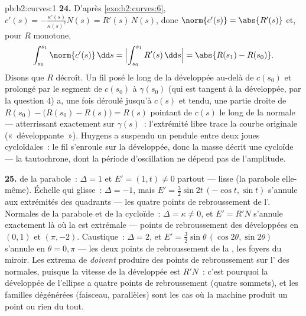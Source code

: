 \begin{solution}{pb:b2:curves:1}
\textbf{24.} D'après \cref{exo:b2:curves:6}, $c'(s) =
-\frac{\kappa'(s)}{\kappa(s)^2}N(s) = R'(s)\,N(s)$, donc
$\norm{c'(s)} = \abs{R'(s)}$ et, pour $R$ monotone,
\[
\int_{s_0}^{s_1}\norm{c'(s)}\,\dd s =
\Bigl|\int_{s_0}^{s_1}R'(s)\,\dd s\Bigr| = \abs{R(s_1) -
R(s_0)} .
\]
Disons que $R$ décroît. Un fil posé le long de la développée
au-delà de $c(s_0)$ et prolongé par le segment de $c(s_0)$ à
$\gamma(s_0)$ (qui est tangent à la développée, par la question 4)
a, une fois déroulé jusqu'à $c(s)$ et tendu, une partie droite de
 $R(s_0) - \bigl(R(s_0) - R(s)\bigr) = R(s)$
pointant de $c(s)$ le long de la normale --- atterrissant
exactement sur $\gamma(s)$~: l'extrémité libre trace la courbe
originale («~développante~»). Huygens a suspendu un pendule entre
deux joues cycloïdales~: le fil s'enroule sur la développée, donc
la masse décrit une cycloïde --- la tautochrone, dont la période
d'oscillation ne dépend pas de l'amplitude.

\textbf{25.}  de la parabole~: $\Delta = 1$ et $E' =
(1, t) \neq 0$ partout ---  lisse (la parabole
elle-même). Échelle qui glisse~: $\Delta = -1$, mais $E' =
\tfrac32\sin 2t\,(-\cos t, \sin t)$ s'annule aux extrémités des
quadrants --- les quatre points de rebroussement de l'.
Normales de la parabole et de la cycloïde~: $\Delta = \kappa \neq
0$, et
$E' = R'N$ s'annule exactement là où la  est extrémale
--- points de rebroussement des développées en $(0,1)$ et $(\pi,
-2)$. Caustique~:
$\Delta = 2$, et $E' = \tfrac32\sin\theta\,(\cos2\theta,
\sin2\theta)$ s'annule en $\theta = 0, \pi$ --- les deux points de
rebroussement de la , les foyers du miroir. Les extrema de
 \emph{doivent} produire des points de rebroussement sur
l' des normales, puisque la vitesse de la développée est
$R'N$~: c'est pourquoi la développée de l'ellipse a quatre points
de rebroussement (quatre sommets),
et les familles dégénérées (faisceau, parallèles) sont les cas
où la machine produit un point ou rien du tout.
\end{solution}

